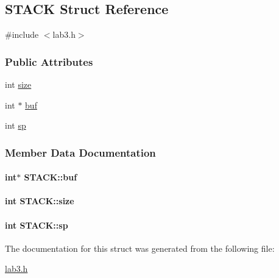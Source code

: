 \hypertarget{structSTACK}{\subsection{S\+T\+A\+C\+K Struct Reference}
\label{structSTACK}
}


{\ttfamily \#include $<$lab3.\+h$>$}

\subsubsection*{Public Attributes}
\begin{DoxyCompactItemize}
\item 
int \hyperlink{structSTACK_ad10f9d8025122e8c82832d7a34c77e40}{size}
\item 
int $\ast$ \hyperlink{structSTACK_a6d512f82cbd75729347a293193039538}{buf}
\item 
int \hyperlink{structSTACK_a1b186cf876dace2f1e30fcbe260cad9a}{sp}
\end{DoxyCompactItemize}


\subsubsection{Member Data Documentation}
\hypertarget{structSTACK_a6d512f82cbd75729347a293193039538}{
\paragraph[{buf}]{\setlength{\rightskip}{0pt plus 5cm}int$\ast$ S\+T\+A\+C\+K\+::buf}}\label{structSTACK_a6d512f82cbd75729347a293193039538}
\hypertarget{structSTACK_ad10f9d8025122e8c82832d7a34c77e40}{
\paragraph[{size}]{\setlength{\rightskip}{0pt plus 5cm}int S\+T\+A\+C\+K\+::size}}\label{structSTACK_ad10f9d8025122e8c82832d7a34c77e40}
\hypertarget{structSTACK_a1b186cf876dace2f1e30fcbe260cad9a}{
\paragraph[{sp}]{\setlength{\rightskip}{0pt plus 5cm}int S\+T\+A\+C\+K\+::sp}}\label{structSTACK_a1b186cf876dace2f1e30fcbe260cad9a}


The documentation for this struct was generated from the following file\+:\begin{DoxyCompactItemize}
\item 
\hyperlink{lab3_8h}{lab3.\+h}\end{DoxyCompactItemize}
